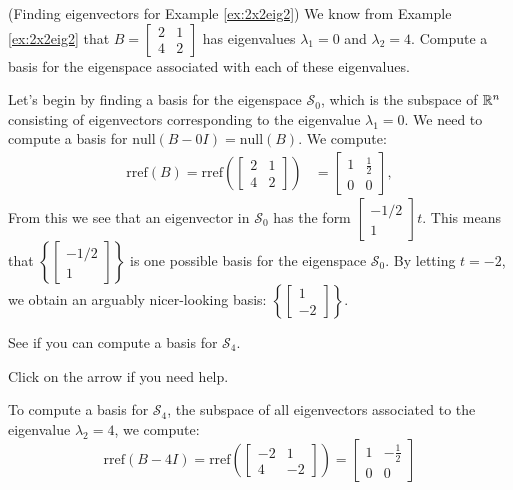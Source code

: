 \documentclass{ximera}
\begin{document}
\begin{example}\label{ex:eigvectors2x2eig2} (Finding eigenvectors for Example \ref{ex:2x2eig2}) 
We know from Example \ref{ex:2x2eig2} that $B=\begin{bmatrix} 2& 1\\ 4&2
\end{bmatrix}$ has eigenvalues $\lambda_1=0$ and $\lambda_2=4$.  Compute a basis for the eigenspace associated with each of these eigenvalues.
\begin{explanation}
Let's begin by finding a basis for the eigenspace $\mathcal{S}_0$, which is the subspace of $\mathbb{R}^n$ consisting of eigenvectors corresponding to the eigenvalue $\lambda_1=0$.  We need to compute a basis for $\mbox{null}(B-0I) = \mbox{null}(B)$.  We compute:
\begin{align*}\mbox{rref}(B)=\mbox{rref}\left(\begin{bmatrix}2&1\\4&2\end{bmatrix}\right)&=\begin{bmatrix}1&\frac{1}{2}\\0&0\end{bmatrix},
\end{align*}
From this we see that an eigenvector in $\mathcal{S}_0$ has the form $\begin{bmatrix}-1/2\\1\end{bmatrix}t$. %
This means that $\left\{\begin{bmatrix}-1/2\\1\end{bmatrix}\right\}$ is one possible basis for the eigenspace $\mathcal{S}_0$.  By letting $t=-2$, we obtain an arguably nicer-looking basis: $\left\{\begin{bmatrix}1\\-2\end{bmatrix}\right\}$. 

See if you can compute a basis for $\mathcal{S}_4$.  

Click on the arrow if you need help.

\begin{expandable}
To compute a basis for $\mathcal{S}_4$, the subspace of all eigenvectors associated to the eigenvalue $\lambda_2=4$, we compute:
$$\mbox{rref}(B-4I)=\mbox{rref}\left(\begin{bmatrix}-2&1\\4&-2\end{bmatrix}\right)=\begin{bmatrix}1&-\frac{1}{2}\\0&0\end{bmatrix}$$
\end{expandable}


\end{explanation}
\end{example}
\end{document}
